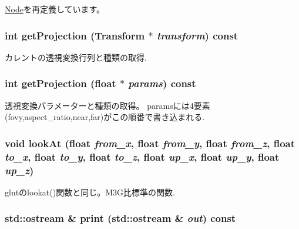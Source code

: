 \hyperlink{classm3g_1_1Node_0b9f7531a4b56d34f47aeb1fff0d37e0}{Node}を再定義しています。\hypertarget{classm3g_1_1Camera_9e0c204df146342990703acb744954b1}{
\subsubsection[{getProjection}]{\setlength{\rightskip}{0pt plus 5cm}int getProjection ({\bf Transform} $\ast$ {\em transform}) const}}
\label{classm3g_1_1Camera_9e0c204df146342990703acb744954b1}


カレントの透視変換行列と種類の取得. \hypertarget{classm3g_1_1Camera_a2ebe46a4e16fee86d4f547588411302}{
\subsubsection[{getProjection}]{\setlength{\rightskip}{0pt plus 5cm}int getProjection (float $\ast$ {\em params}) const}}
\label{classm3g_1_1Camera_a2ebe46a4e16fee86d4f547588411302}


透視変換パラメーターと種類の取得。 paramsには4要素(fovy,aspect\_\-ratio,near,far)がこの順番で書き込まれる. \hypertarget{classm3g_1_1Camera_0006b18ae0e27a031d533e987b9756a8}{
\subsubsection[{lookAt}]{\setlength{\rightskip}{0pt plus 5cm}void lookAt (float {\em from\_\-x}, \/  float {\em from\_\-y}, \/  float {\em from\_\-z}, \/  float {\em to\_\-x}, \/  float {\em to\_\-y}, \/  float {\em to\_\-z}, \/  float {\em up\_\-x}, \/  float {\em up\_\-y}, \/  float {\em up\_\-z})}}
\label{classm3g_1_1Camera_0006b18ae0e27a031d533e987b9756a8}


glutのlookat()関数と同じ。M3G比標準の関数. \hypertarget{classm3g_1_1Camera_6fea17fa1532df3794f8cb39cb4f911f}{
\subsubsection[{print}]{\setlength{\rightskip}{0pt plus 5cm}std::ostream \& print (std::ostream \& {\em out}) const}}
\label{classm3g_1_1Camera_6fea17fa1532df3794f8cb39cb4f911f}


